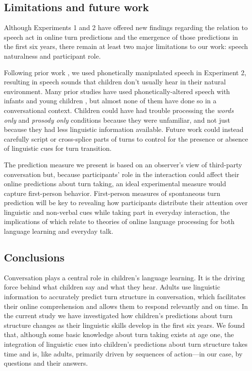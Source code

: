 \documentclass[authoryear, 12pt]{elsarticle}
\begin{document}
\subsection{Limitations and future work}

Although Experiments 1 and 2 have offered new findings regarding the relation to speech act in online turn predictions and the emergence of those predictions in the first six years, there remain at least two major limitations to our work: speech naturalness and participant role.

Following prior work \citep{de-ruiter2006, keitel2013}, we used phonetically manipulated speech in Experiment 2, resulting in speech sounds that children don't usually hear in their natural environment. Many prior studies have used phonetically-altered speech with infants and young children \citep[cf.][]{jusczyk2000}, but almost none of them have done so in a conversational context. Children could have had trouble processing the \textit{words only} and \textit{prosody only} conditions because they were unfamiliar, and not just because they had less linguistic information available. Future work could instead carefully script or cross-splice parts of turns to control for the presence or absence of linguistic cues for turn transition.

The prediction measure we present is based on an observer's view of third-party conversation but, because participants' role in the interaction could affect their online predictions about turn taking, an ideal experimental measure would capture first-person behavior. First-person measures of spontaneous turn prediction will be key to revealing how participants distribute their attention over linguistic and non-verbal cues while taking part in everyday interaction, the implications of which relate to theories of online language processing for both language learning and everyday talk.

\subsection{Conclusions}

Conversation plays a central role in children's language learning. It is the driving force behind what children say and what they hear. Adults use linguistic information to accurately predict turn structure in conversation, which facilitates their online comprehension and allows them to respond relevantly and on time. In the current study we have investigated how children's predictions about turn structure changes as their linguistic skills develop in the first six years. We found that, although some basic knowledge about turn taking exists at age one, the integration of linguistic cues into children's predictions about turn structure takes time and is, like adults, primarily driven by sequences of action---in our case, by questions and their answers.
\end{document}
